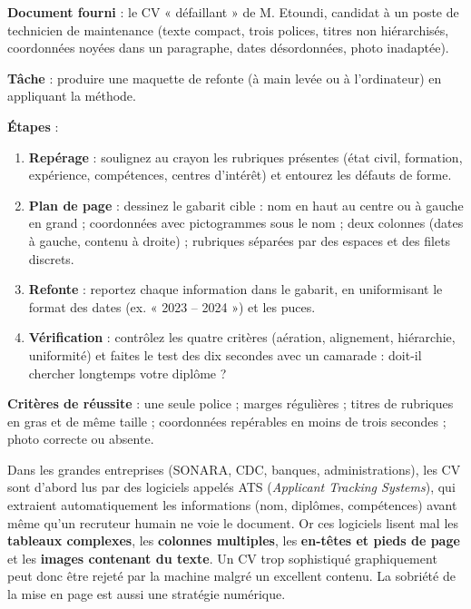 \documentclass[11pt]{article}
\newcommand{\cle}[1]{{\popxbold\color{popdark}#1}}
\begin{document}
\begin{experience}
\textbf{Document fourni} : le CV « défaillant » de M. Etoundi, candidat à un poste de technicien de maintenance (texte compact, trois polices, titres non hiérarchisés, coordonnées noyées dans un paragraphe, dates désordonnées, photo inadaptée).

\textbf{Tâche} : produire une maquette de refonte (à main levée ou à l'ordinateur) en appliquant la méthode.

\textbf{Étapes} :
\begin{enumerate}
\item \textbf{Repérage} : soulignez au crayon les rubriques présentes (état civil, formation, expérience, compétences, centres d'intérêt) et entourez les défauts de forme.
\item \textbf{Plan de page} : dessinez le gabarit cible : nom en haut au centre ou à gauche en grand ; coordonnées avec pictogrammes sous le nom ; deux colonnes (dates à gauche, contenu à droite) ; rubriques séparées par des espaces et des filets discrets.
\item \textbf{Refonte} : reportez chaque information dans le gabarit, en uniformisant le format des dates (ex. « 2023 – 2024 ») et les puces.
\item \textbf{Vérification} : contrôlez les quatre critères (aération, alignement, hiérarchie, uniformité) et faites le test des dix secondes avec un camarade : doit-il chercher longtemps votre diplôme ?
\end{enumerate}

\textbf{Critères de réussite} : une seule police ; marges régulières ; titres de rubriques en gras et de même taille ; coordonnées repérables en moins de trois secondes ; photo correcte ou absente.
\end{experience}

\begin{savaistu}
Dans les grandes entreprises (SONARA, CDC, banques, administrations), les CV sont d'abord lus par des logiciels appelés \cle{ATS} (\emph{Applicant Tracking Systems}), qui extraient automatiquement les informations (nom, diplômes, compétences) avant même qu'un recruteur humain ne voie le document. Or ces logiciels lisent mal les \textbf{tableaux complexes}, les \textbf{colonnes multiples}, les \textbf{en-têtes et pieds de page} et les \textbf{images contenant du texte}. Un CV trop sophistiqué graphiquement peut donc être rejeté par la machine malgré un excellent contenu. La sobriété de la mise en page est aussi une stratégie numérique.
\end{savaistu}
\end{document}
